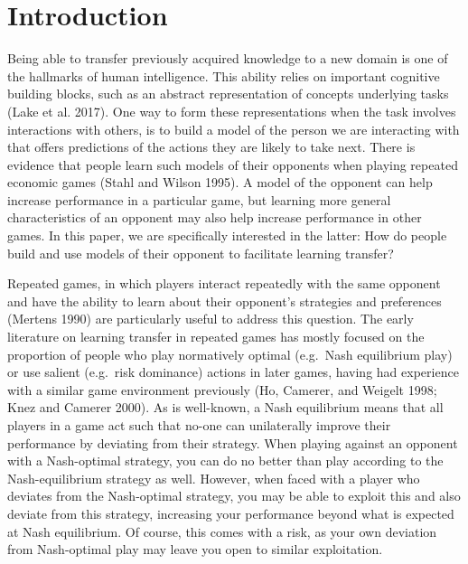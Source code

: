 \documentclass[smallextended]{svjour3}       %
\begin{document}
\def\spacingset#1{\renewcommand{\baselinestretch}%
{#1}\small\normalsize} \spacingset{1}


\hypertarget{introduction}{%
\section{Introduction}\label{introduction}}

Being able to transfer previously acquired knowledge to a new domain is
one of the hallmarks of human intelligence. This ability relies on
important cognitive building blocks, such as an abstract representation
of concepts underlying tasks (Lake et al. 2017). One way to form these
representations when the task involves interactions with others, is to
build a model of the person we are interacting with that offers
predictions of the actions they are likely to take next. There is
evidence that people learn such models of their opponents when playing
repeated economic games (Stahl and Wilson 1995). A model of the opponent
can help increase performance in a particular game, but learning more
general characteristics of an opponent may also help increase
performance in other games. In this paper, we are specifically
interested in the latter: How do people build and use models of their
opponent to facilitate learning transfer?

Repeated games, in which players interact repeatedly with the same
opponent and have the ability to learn about their opponent's strategies
and preferences (Mertens 1990) are particularly useful to address this
question. The early literature on learning transfer in repeated games
has mostly focused on the proportion of people who play normatively
optimal (e.g.~Nash equilibrium play) or use salient (e.g.~risk
dominance) actions in later games, having had experience with a similar
game environment previously (Ho, Camerer, and Weigelt 1998; Knez and
Camerer 2000). As is well-known, a Nash equilibrium means that all
players in a game act such that no-one can unilaterally improve their
performance by deviating from their strategy. When playing against an
opponent with a Nash-optimal strategy, you can do no better than play
according to the Nash-equilibrium strategy as well. However, when faced
with a player who deviates from the Nash-optimal strategy, you may be
able to exploit this and also deviate from this strategy, increasing
your performance beyond what is expected at Nash equilibrium. Of course,
this comes with a risk, as your own deviation from Nash-optimal play may
leave you open to similar exploitation.
\end{document}
